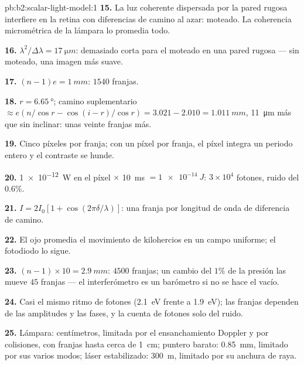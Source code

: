 \begin{solution}{pb:b2:scalar-light-model:1}
\textbf{15.} La luz coherente dispersada por la pared rugosa interfiere en
la retina con diferencias de camino al azar: moteado. La coherencia
micrométrica de la lámpara lo promedia todo.

\textbf{16.} $\lambda^2/\Delta\lambda = \qty{17}{\micro m}$: demasiado corta para el moteado en una
pared rugosa --- sin moteado, una imagen más suave.

\textbf{17.} $(n - 1)e = \qty{1}{mm}$: $1540$ franjas.

\textbf{18.} $r = \qty{6.65}{\degree}$; camino suplementario $\approx e(n/\cos r - \cos(i - r)/\cos r)
= 3.021 - 2.010 = \qty{1.011}{mm}$, \qty{11}{\micro m} más que sin inclinar: unas
veinte franjas más.

\textbf{19.} Cinco píxeles por franja; con un píxel por franja, el píxel
integra un periodo entero y el contraste se hunde.

\textbf{20.} \qty{1e-12}{W} en el píxel $\times$ \qty{10}{ms} $= \qty{1e-14}{J}$: $3 \times 10^4$
fotones, ruido del $0.6\%$.

\textbf{21.} $I = 2I_0[1 + \cos(2\pi\delta/\lambda)]$: una franja por longitud de onda de
diferencia de camino.

\textbf{22.} El ojo promedia el movimiento de kilohercios en un campo
uniforme; el fotodiodo lo sigue.

\textbf{23.} $(n - 1) \times 10 = \qty{2.9}{mm}$: $4500$ franjas; un cambio del $1\%$ de
la presión las mueve $45$ franjas --- el interferómetro es un
barómetro si no se hace el vacío.

\textbf{24.} Casi el mismo ritmo de fotones (\qty{2.1}{eV} frente a \qty{1.9}{eV});
las franjas dependen de las amplitudes y las fases, y la cuenta de fotones solo del
ruido.

\textbf{25.} Lámpara: centímetros, limitada por el ensanchamiento Doppler y por
colisiones, con franjas hasta cerca de \qty{1}{cm}; puntero barato: \qty{0.85}{mm},
limitado por sus varios modos; láser estabilizado: \qty{300}{m}, limitado por
su anchura de raya.
\end{solution}
